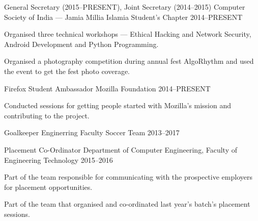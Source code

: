 \begin{cventries}
\cventry%
  {General Secretary (2015--PRESENT), Joint Secretary (2014--2015)} %
  {Computer Society of India --- Jamia Millia Islamia Student's Chapter} %
  {} %
  {2014--PRESENT} %
  {%
    \begin{cvitems} %
      \item{Organised three technical workshops --- Ethical Hacking and Network
            Security, Android Development and Python Programming.}
      \item{Organised a photography competition during annual fest AlgoRhythm
            and used the event to get the fest photo coverage.}
    \end{cvitems}
  }

\cventry%
  {Firefox Student Ambassador} %
  {Mozilla Foundation} %
  {} %
  {2014--PRESENT} %
  {%
    \begin{cvitems} %
      \item{Conducted sessions for getting people started with Mozilla's mission
            and contributing to the project.}
    \end{cvitems}
  }

\cventry%
  {Goalkeeper} %
  {Enginerring Faculty Soccer Team} %
  {} %
  {2013--2017} %
  {%
  }

\cventry%
  {Placement Co-Ordinator} %
  {Department of Computer Engineering, Faculty of Engineering Technology} %
  {} %
  {2015--2016} %
  {%
    \begin{cvitems} %
      \item{Part of the team responsible for communicating with the
            prospective employers for placement opportunities.}
      \item{Part of the team that organised and co-ordinated last year's
            batch's placement sessions.}
    \end{cvitems}
  }

\end{cventries}
